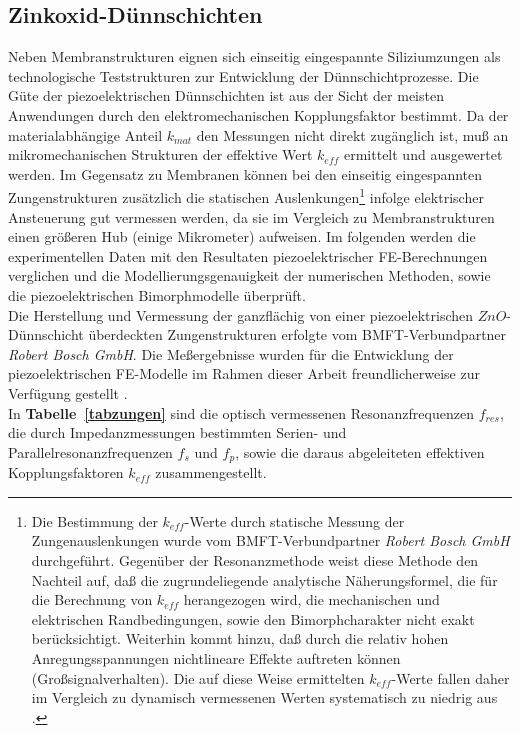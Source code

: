 \subsection{Zinkoxid-Dünnschichten}
\label{zno}

Neben Membranstrukturen eignen sich einseitig eingespannte Siliziumzungen
als technologische Teststrukturen zur Entwicklung der
Dünnschichtprozesse. Die Güte der piezoelektrischen
Dünnschichten ist aus der Sicht der meisten Anwendungen durch den
elektromechanischen Kopplungsfaktor bestimmt. Da der materialabhängige
Anteil $k_{mat}$ den Messungen nicht direkt zugänglich ist, muß an
mikromechanischen Strukturen der effektive Wert $k_{eff}$ ermittelt
und ausgewertet werden. Im Gegensatz zu Membranen können bei den einseitig
eingespannten Zungenstrukturen zusätzlich die statischen
%
Auslenkungen\footnote{Die Bestimmung der $k_{eff}$-Werte durch statische
Messung der Zungenauslenkungen wurde vom BMFT-Verbundpartner
{\sl Robert Bosch GmbH} durchgeführt. Gegenüber der Resonanzmethode weist
diese Methode den Nachteil auf, daß die zugrundeliegende analytische
Näherungsformel, die für die Berechnung von $k_{eff}$ herangezogen
wird, die mechanischen und elektrischen Randbedingungen, sowie den
Bimorphcharakter nicht exakt berücksichtigt. Weiterhin kommt hinzu, daß
durch die relativ hohen Anregungsspannungen %
nichtlineare Effekte auftreten können (Großsignalverhalten). Die auf diese
Weise ermittelten $k_{eff}$-Werte fallen daher im Vergleich zu dynamisch
vermessenen Werten systematisch zu niedrig aus \cite{ABV93}.}
%
infolge elektrischer Ansteuerung gut vermessen werden, da sie im Vergleich
zu Membranstrukturen einen größeren Hub (einige Mikrometer) aufweisen.
Im folgenden werden die
experimentellen Daten mit den Resultaten piezoelektrischer FE-Berechnungen
verglichen und die Modellierungsgenauigkeit der numerischen Methoden, sowie
die piezoelektrischen Bimorphmodelle überprüft.\\
%
Die Herstellung und Vermessung der
ganzflächig von einer piezoelektrischen $ZnO$-Dünnschicht überdeckten
Zungenstrukturen erfolgte vom BMFT-Verbundpartner {\sl Robert Bosch GmbH}.
Die Meßergebnisse wurden für die Entwicklung der piezoelektrischen
FE-Modelle im Rahmen dieser Arbeit freundlicherweise zur Verfügung gestellt
\cite{Flik}.\\
%
In {\bf Tabelle~\ref{tabzungen}} sind die optisch vermessenen
Resonanzfrequenzen $f_{res}$, die durch Impedanzmessungen bestimmten
Serien- und Parallelresonanzfrequenzen $f_{s}$ und $f_{p}$, sowie die
daraus abgeleiteten effektiven Kopplungsfaktoren $k_{eff}$ zusammengestellt.
